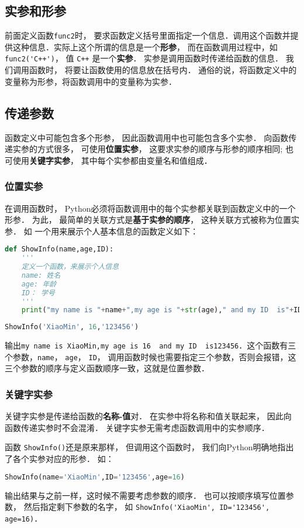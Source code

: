 \subsection{实参和形参}
前面定义函数\verb|func2|时， 要求函数定义括号里面指定一个信息．调用这个函数并提供这种信息．实际上这个所谓的信息是一个\textbf{形参}， 而在函数调用过程中，如\verb|func2('C++')|， 值 \verb|C++| 是一个\textbf{实参}． 实参是调用函数时传递给函数的信息． 我们调用函数时， 将要让函数使用的信息放在括号内． 通俗的说，将函数定义中的变量称为形参，将函数调用中的变量称为实参．

\subsection{传递参数}
函数定义中可能包含多个形参， 因此函数调用中也可能包含多个实参． 向函数传递实参的方式很多， 可使用\textbf{位置实参}， 这要求实参的顺序与形参的顺序相同; 也可使用\textbf{关键字实参}， 其中每个实参都由变量名和值组成．
\subsubsection{位置实参}
在调用函数时， Python必须将函数调用中的每个实参都关联到函数定义中的一个形参． 为此， 最简单的关联方式是\textbf{基于实参的顺序}， 这种关联方式被称为位置实参． 如
一个用来展示个人基本信息的函数定义如下：
\begin{lstlisting}[language=python]
def ShowInfo(name,age,ID):
    '''
    定义一个函数，来展示个人信息
    name: 姓名
    age: 年龄
    ID： 学号
    '''
    print("my name is "+name+",my age is "+str(age)," and my ID  is"+ID)
\end{lstlisting}
\begin{lstlisting}[language=python]
ShowInfo('XiaoMin', 16,'123456')
\end{lstlisting}
输出\verb|my name is XiaoMin,my age is 16  and my ID  is123456|．这个函数有三个参数，\verb|name|， \verb|age|， \verb|ID|， 调用函数时候也需要指定三个参数，否则会报错，这三个参数的顺序与定义函数顺序一致，这就是位置参数．
\subsubsection{关键字实参}
关键字实参是传递给函数的\textbf{名称-值}对． 在实参中将名称和值关联起来， 因此向函数传递实参时不会混淆． 关键字实参无需考虑函数调用中的实参顺序．

函数 \verb|ShowInfo()|还是原来那样， 但调用这个函数时， 我们向Python明确地指出了各个实参对应的形参． 如：
\begin{lstlisting}[language=python]
ShowInfo(name='XiaoMin',ID='123456',age=16)
\end{lstlisting}
输出结果与之前一样，这时候不需要考虑参数的顺序． 也可以按顺序填写位置参数， 然后指定剩下参数的名字， 如 \verb|ShowInfo('XiaoMin', ID='123456', age=16)|．

